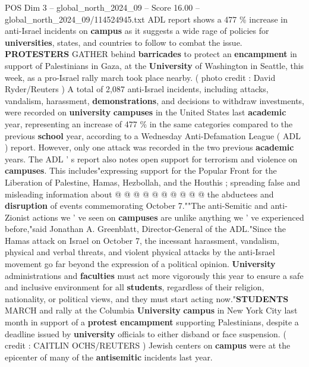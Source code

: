 \begin{textsample}{POS Dim 3 – global\_north\_2024\_09 – Score 16.00 – global\_north\_2024\_09/114524945.txt}  \label{ex:f3_pos_166}
ADL report shows a 477 \% increase in anti-Israel incidents on \textbf{campus} as it suggests a wide rage of policies for \textbf{universities}, states, and countries to follow to combat the issue. \textbf{PROTESTERS} GATHER behind \textbf{barricades} to protect an \textbf{encampment} in support of Palestinians in Gaza, at the \textbf{University} of Washington in Seattle, this week, as a pro-Israel rally march took place nearby. ( photo credit : David Ryder/Reuters ) A total of 2,087 anti-Israel incidents, including attacks, vandalism, harassment, \textbf{demonstrations}, and decisions to withdraw investments, were recorded on \textbf{university} \textbf{campuses} in the United States last \textbf{academic} year, representing an increase of 477 \% in the same categories compared to the previous \textbf{school} year, according to a Wednesday Anti-Defamation League ( ADL ) report.
However, only one attack was recorded in the two previous \textbf{academic} years.
The ADL ' s report also notes open support for terrorism and violence on \textbf{campuses}.
This includes"expressing support for the Popular Front for the Liberation of Palestine, Hamas, Hezbollah, and the Houthis ; spreading false and misleading information about @ @ @ @ @ @ @ @ @ @ the abductees and \textbf{disruption} of events commemorating October 7.""The anti-Semitic and anti-Zionist actions we ' ve seen on \textbf{campuses} are unlike anything we ' ve experienced before,"said Jonathan A.
Greenblatt, Director-General of the ADL."Since the Hamas attack on Israel on October 7, the incessant harassment, vandalism, physical and verbal threats, and violent physical attacks by the anti-Israel movement go far beyond the expression of a political opinion. \textbf{University} administrations and \textbf{faculties} must act more vigorously this year to ensure a safe and inclusive environment for all \textbf{students}, regardless of their religion, nationality, or political views, and they must start acting now."\textbf{STUDENTS} MARCH and rally at the Columbia \textbf{University} \textbf{campus} in New York City last month in support of a \textbf{protest} \textbf{encampment} supporting Palestinians, despite a deadline issued by \textbf{university} officials to either disband or face suspension. ( credit : CAITLIN OCHS/REUTERS ) Jewish centers on \textbf{campus} were at the epicenter of many of the \textbf{antisemitic} incidents last year.

\end{textsample}
